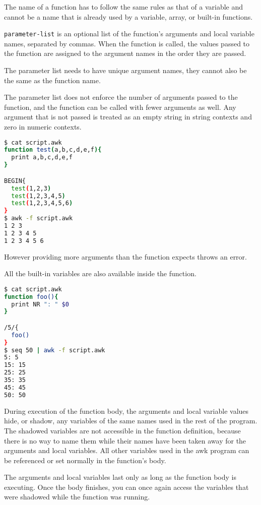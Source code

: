 The name of a function has to follow the same rules as that of a variable and cannot be a name that is already used by a variable, array, or built-in functions.

\lstinline|parameter-list| is an optional list of the function’s arguments and local variable names, separated by commas. 
When the function is called, the values passed to the function are assigned to the argument names in the order they are passed.

The parameter list needs to have unique argument names, they cannot also be the same as the function name.

The parameter list does not enforce the number of arguments passed to the function, and the function can be called with fewer arguments as well.
Any argument that is not passed is treated as an empty string in string contexts and zero in numeric contexts.

\begin{lstlisting}[language=bash]
$ cat script.awk
function test(a,b,c,d,e,f){
  print a,b,c,d,e,f
}

BEGIN{
  test(1,2,3)
  test(1,2,3,4,5)
  test(1,2,3,4,5,6)
}
$ awk -f script.awk
1 2 3
1 2 3 4 5
1 2 3 4 5 6
\end{lstlisting}

However providing more arguments than the function expects throws an error.

All the built-in variables are also available inside the function.

\begin{lstlisting}[language=bash]
$ cat script.awk
function foo(){
  print NR ": " $0
}

/5/{
  foo()
}
$ seq 50 | awk -f script.awk
5: 5
15: 15
25: 25
35: 35
45: 45
50: 50
\end{lstlisting}

During execution of the function body, the arguments and local variable values hide, or shadow, any variables of the same names used in the rest of the program. The shadowed variables are not accessible in the function definition, because there is no way to name them while their names have been taken away for the arguments and local variables. All other variables used in the awk program can be referenced or set normally in the function’s body.

The arguments and local variables last only as long as the function body is executing. Once the body finishes, you can once again access the variables that were shadowed while the function was running.

